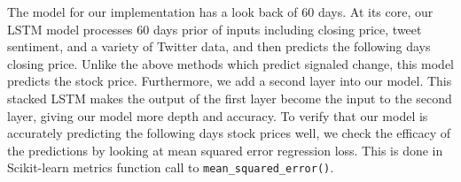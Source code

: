 \documentclass[../thesis.tex]{subfiles}
\begin{document}
The model for our implementation has a look back of 60 days. At its core, our LSTM model processes 60 days prior of inputs including closing price, tweet sentiment, and a variety of Twitter data, and then predicts the following days closing price. Unlike the above methods which predict signaled change, this model predicts the stock price. Furthermore, we add a second layer into our model. This stacked LSTM makes the output of the first layer become the input to the second layer, giving our model more depth and accuracy. To verify that our model is accurately predicting the following days stock prices well, we check the efficacy of the predictions by looking at mean squared error regression loss. This is done in Scikit-learn metrics function call to \texttt{mean\_squared\_error()}. 
\end{document}
